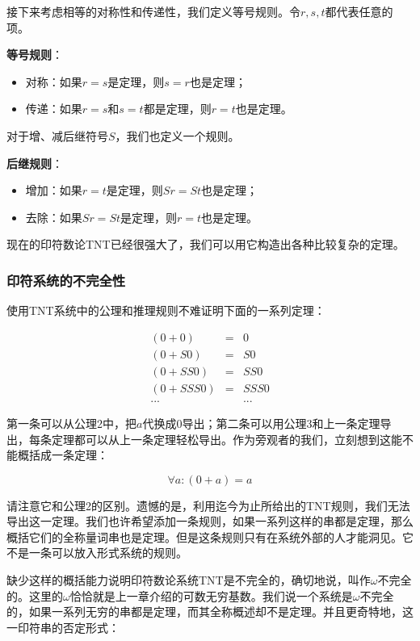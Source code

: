 \documentclass{article}
\begin{document}
接下来考虑相等的对称性和传递性，我们定义等号规则。令$r, s, t$都代表任意的项。

\textbf{等号规则}：
\begin{itemize}
\item 对称：如果$r = s$是定理，则$s = r$也是定理；
\item 传递：如果$r = s$和$s = t$都是定理，则$r = t$也是定理。
\end{itemize}

对于增、减后继符号$S$，我们也定义一个规则。

\textbf{后继规则}：
\begin{itemize}
\item 增加：如果$r = t$是定理，则$Sr = St$也是定理；
\item 去除：如果$Sr = St$是定理，则$r = t$也是定理。
\end{itemize}

现在的印符数论TNT已经很强大了，我们可以用它构造出各种比较复杂的定理。

\begin{Exercise}
\end{Exercise}

\subsubsection{印符系统的不完全性}

使用TNT系统中的公理和推理规则不难证明下面的一系列定理：

\[
\begin{array}{rcl}
(0 + 0) & = & 0 \\
(0 + S0) & = & S0 \\
(0 + SS0) & = & SS0 \\
(0 + SSS0) & = & SSS0 \\
... & & ...
\end{array}
\]

第一条可以从公理2中，把$a$代换成0导出；第二条可以用公理3和上一条定理导出，每条定理都可以从上一条定理轻松导出。作为旁观者的我们，立刻想到这能不能概括成一条定理：

\[
\forall a: (0 + a) = a
\]

请注意它和公理2的区别。遗憾的是，利用迄今为止所给出的TNT规则，我们无法导出这一定理。我们也许希望添加一条规则，如果一系列这样的串都是定理，那么概括它们的全称量词串也是定理。但是这条规则只有在系统外部的人才能洞见。它不是一条可以放入形式系统的规则。

缺少这样的概括能力说明印符数论系统TNT是不完全的，确切地说，叫作$\omega$不完全的。这里的$\omega$恰恰就是上一章介绍的可数无穷基数。我们说一个系统是$\omega$不完全的，如果一系列无穷的串都是定理，而其全称概述却不是定理。并且更奇特地，这一印符串的否定形式：
\end{document}
